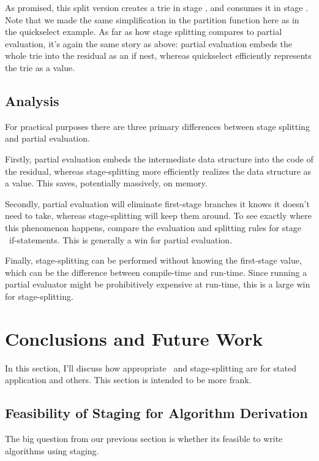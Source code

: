 As promised, this split version creates a trie in stage \bbone, and consumes it in stage \bbtwo.
Note that we made the same simplification in the partition function here as in the quickselect example.
As far as how stage splitting compares to partial evaluation, it's again the same story as above:
partial evaluation embeds the whole trie into the residual as an if nest, 
whereas quickselect efficiently represents the trie as a value.

\subsection{Analysis}

For practical purposes there are three primary differences between stage splitting and partial evaluation.

Firstly, partial evaluation embeds the intermediate data structure into the code of the residual, whereas
stage-splitting more efficiently realizes the data structure as a value.  This saves, potentially massively, on memory.

Secondly, partial evaluation will eliminate first-stage branches it knows it doesn't need to take,
whereas stage-splitting will keep them around.  
To see exactly where this phenomenon happens, compare the evaluation and splitting rules for stage \bbone\ if-statements.
This is generally a win for partial evaluation.

Finally, stage-splitting can be performed without knowing the first-stage value,
which can be the difference between compile-time and run-time.
Since running a partial evaluator might be prohibitively expensive at run-time, this is a large win for stage-splitting.

\section{Conclusions and Future Work}

In this section, I'll discuss how appropriate \lang\ and stage-splitting are for stated application and others.  
This section is intended to be more frank.

\subsection{Feasibility of Staging for Algorithm Derivation}

The big question from our previous section is whether its feasible to write algorithms using staging.  

